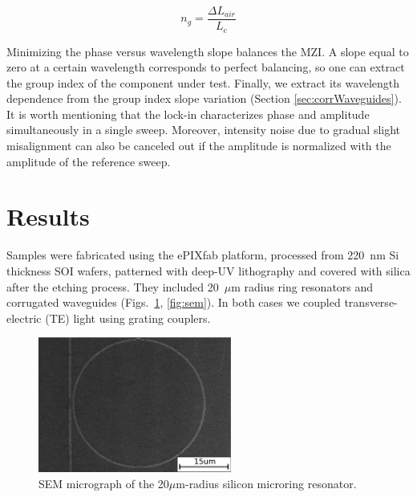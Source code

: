 \documentclass[journal]{IEEEtran}
\newcommand{\fwidthSmall}{2.5in}
\begin{document}
\begin{equation}
  n_{g} = \frac{\Delta L_{air}}{L_{c}}
  \label{eq:group_index_pathBalancing}
\end{equation}

Minimizing the phase versus wavelength slope balances the MZI.
A slope equal to zero at a certain wavelength corresponds to perfect balancing, so one can extract the group index of the component under test.
Finally, we extract its wavelength dependence from the group index slope variation (Section \ref{sec:corrWaveguides}).
It is worth mentioning that the lock-in characterizes phase and amplitude simultaneously in a single sweep.
Moreover, intensity noise due to gradual slight misalignment can also be canceled out if the amplitude is normalized with the amplitude of the reference sweep.

\section{Results}
Samples were fabricated using the ePIXfab platform, processed from 220~nm Si thickness SOI wafers, patterned with deep-UV lithography and covered with silica after the etching process.
They included 20~$\mu$m radius ring resonators and corrugated waveguides (Figs.~\ref{fig:semRingPaperRings}, \ref{fig:sem}).
In both cases we coupled transverse-electric (TE) light using grating couplers.

\begin{figure}[htb]
    \centering
    \includegraphics[width=\fwidthSmall]{ringTEscale2}
    \caption{SEM micrograph of the 20$\mu$m-radius silicon microring resonator.}
    \label{fig:semRingPaperRings}
\end{figure}
\end{document}
